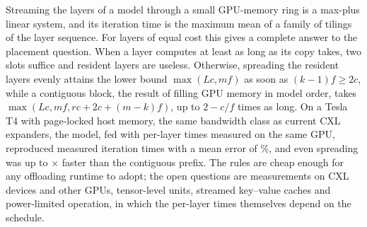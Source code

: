 Streaming the layers of a model through a small GPU-memory ring is a max-plus linear system, and its iteration time is the maximum mean of a family of tilings of the layer sequence. For layers of equal cost this gives a complete answer to the placement question. When a layer computes at least as long as its copy takes, two slots suffice and resident layers are useless. Otherwise, spreading the resident layers evenly attains the lower bound $\max(Lc,mf)$ as soon as $(k-1)f\ge2c$, while a contiguous block, the result of filling GPU memory in model order, takes $\max(Lc,mf,rc+2c+(m-k)f)$, up to $2-c/f$ times as long. On a Tesla T4 with page-locked host memory, the same bandwidth class as current CXL expanders, the model, fed with per-layer times measured on the same GPU, reproduced \nAccN{} measured iteration times with a mean error of \nAccMape\%, and even spreading was up to \nMeasPenaltyMax$\times$ faster than the contiguous prefix. The rules are cheap enough for any offloading runtime to adopt; the open questions are measurements on CXL devices and other GPUs, tensor-level units, streamed key--value caches and power-limited operation, in which the per-layer times themselves depend on the schedule.
